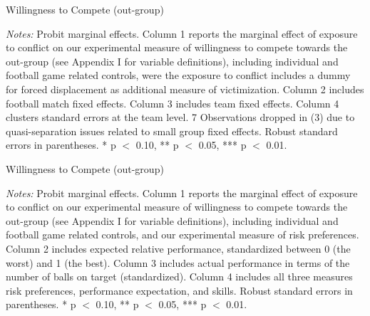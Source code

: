 \pagebreak

\begin{threeparttable}[p!]
	\caption{Willingness to Compete (out-group)}
	\label{tab:slf:compete_disp}
	\centering
	\tiny
	
	\begin{tablenotes}
		\item \textit{Notes:} Probit marginal effects. Column 1 reports the marginal effect of exposure to conflict on our experimental measure of willingness to compete towards the out-group (see Appendix I for variable definitions), including individual and football game related controls, were the exposure to conflict includes a dummy for forced displacement as additional measure of victimization. Column 2 includes football match fixed effects. Column 3 includes team fixed effects. Column 4 clusters standard errors at the team level. 7 Observations dropped in (3) due to quasi-separation issues related to small group fixed effects. Robust standard errors in parentheses. * p $<$ 0.10, ** p $<$ 0.05, *** p $<$ 0.01.
		\item
	\end{tablenotes}
\end{threeparttable}

\pagebreak

\begin{threeparttable}[p!]
	\caption{Willingness to Compete (out-group)}
	\label{tab:slf:compete_abl}
	\centering
	\tiny
	
	\begin{tablenotes}
		\item \textit{Notes:} Probit marginal effects. Column 1 reports the marginal effect of exposure to conflict on our experimental measure of willingness to compete towards the out-group (see Appendix I for variable definitions), including individual and football game related controls, and our experimental measure of risk preferences. Column 2 includes expected relative performance, standardized between 0 (the worst) and 1 (the best). Column 3 includes actual performance in terms of the number of balls on target (standardized). Column 4 includes all three measures risk preferences, performance expectation, and skills. Robust standard errors in parentheses.  * p $<$ 0.10, ** p $<$ 0.05, *** p $<$ 0.01.
		\item
	\end{tablenotes}
\end{threeparttable}

\clearpage

